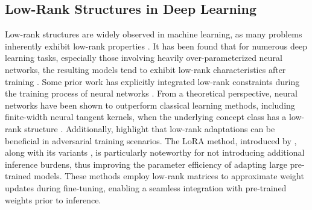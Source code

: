 \subsection{Low-Rank Structures in Deep Learning}

Low-rank structures are widely observed in machine learning, as many problems inherently exhibit low-rank properties \citep{li2016lora, cai2010singular, li2018low, grasedyck2013low}. It has been found that for numerous deep learning tasks, especially those involving heavily over-parameterized neural networks, the resulting models tend to exhibit low-rank characteristics after training \citep{oymak2019generalization, khodak2021initialization}. Some prior work has explicitly integrated low-rank constraints during the training process of neural networks \citep{sainath2013low, zhang2014facial, zhao2016energy}. From a theoretical perspective, neural networks have been shown to outperform classical learning methods, including finite-width neural tangent kernels, when the underlying concept class has a low-rank structure \citep{allen2019convergence, li2018learning, ghorbani2020neural, allen2019can, allen2020backward}. Additionally, \citet{allen2020backward_correction} highlight that low-rank adaptations can be beneficial in adversarial training scenarios. The LoRA method, introduced by \citet{hu2021lora}, along with its variants \citep{zhang2023svd, yeh2023lora}, is particularly noteworthy for not introducing additional inference burdens, thus improving the parameter efficiency of adapting large pre-trained models. These methods employ low-rank matrices to approximate weight updates during fine-tuning, enabling a seamless integration with pre-trained weights prior to inference.
